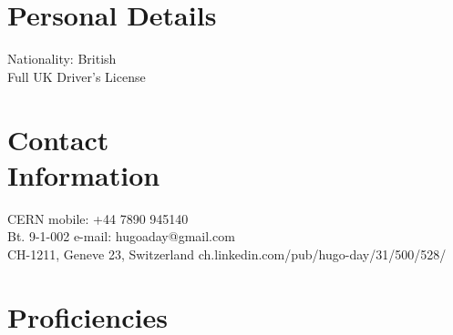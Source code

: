 \documentclass[margin,line]{resume}
\begin{document}
\begin{resume}

    \section{\mysidestyle Personal Details}
    Nationality: British \vspace{0mm}\\\vspace{-4.5mm}%
    Full UK Driver's License  \vspace{0mm}\\\vspace{-4.5mm}%


    \section{\mysidestyle Contact\\Information}
    CERN                            \hfill mobile: +44 7890 945140          \vspace{0mm}\\\vspace{0mm}%
    Bt. 9-1-002                          \hfill e-mail: hugoaday@gmail.com  \vspace{0mm}\\\vspace{-4.5mm} %
   CH-1211, Geneve 23, Switzerland      \hfill ch.linkedin.com/pub/hugo-day/31/500/528/  \vspace{0mm}\\\vspace{-4.5mm}%

%

    \section{\mysidestyle Proficiencies}


\end{resume}
\end{document}
